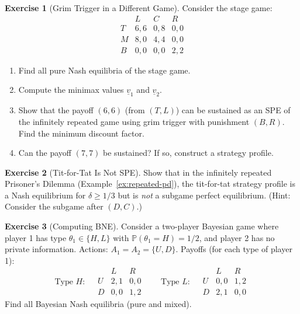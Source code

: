 \documentclass[11pt,a4paper]{article}
\theoremstyle{definition}
\newtheorem{exercise}{Exercise}[section]
\theoremstyle{plain}
\theoremstyle{remark}
\newcommand{\Prob}{\mathbb{P}}
\begin{document}
\begin{exercise}[Grim Trigger in a Different Game]
\label{ex:grim-trigger-general}
Consider the stage game:
\[
\begin{array}{c|ccc}
  & L & C & R \\ \hline
T & 6,6 & 0,8 & 0,0 \\
M & 8,0 & 4,4 & 0,0 \\
B & 0,0 & 0,0 & 2,2
\end{array}
\]
\begin{enumerate}[label=(\alph*)]
    \item Find all pure Nash equilibria of the stage game.
    \item Compute the minimax values $\underline{v}_1$ and $\underline{v}_2$.
    \item Show that the payoff $(6,6)$ (from $(T,L)$) can be sustained as an SPE of the
    infinitely repeated game using grim trigger with punishment $(B,R)$. Find the minimum
    discount factor.
    \item Can the payoff $(7,7)$ be sustained? If so, construct a strategy profile.
\end{enumerate}
\end{exercise}

\begin{exercise}[Tit-for-Tat Is Not SPE]
\label{ex:tft-not-spe}
Show that in the infinitely repeated Prisoner's Dilemma (Example~\ref{ex:repeated-pd}),
the tit-for-tat strategy profile is a Nash equilibrium for $\delta \geq 1/3$ but is
\emph{not} a subgame perfect equilibrium. (Hint: Consider the subgame after $(D, C)$.)
\end{exercise}

\begin{exercise}[Computing BNE]
\label{ex:compute-bne}
Consider a two-player Bayesian game where player 1 has type $\theta_1 \in \{H, L\}$ with
$\Prob(\theta_1 = H) = 1/2$, and player 2 has no private information. Actions:
$A_1 = A_2 = \{U, D\}$. Payoffs (for each type of player 1):
\[
\text{Type } H: \quad
\begin{array}{c|cc}
  & L & R \\ \hline
U & 2,1 & 0,0 \\
D & 0,0 & 1,2
\end{array}
\qquad \text{Type } L: \quad
\begin{array}{c|cc}
  & L & R \\ \hline
U & 0,0 & 1,2 \\
D & 2,1 & 0,0
\end{array}
\]
Find all Bayesian Nash equilibria (pure and mixed).
\end{exercise}
\end{document}
